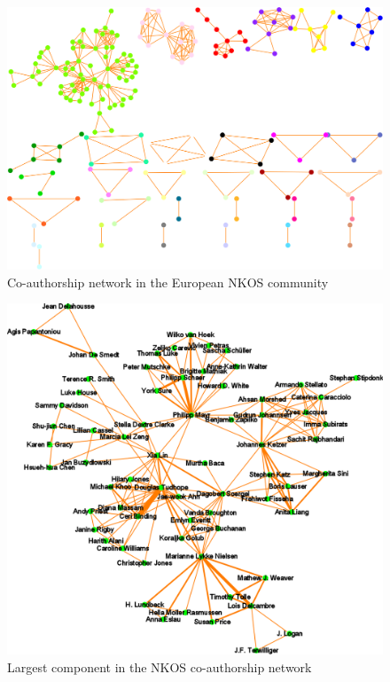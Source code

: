 \documentclass[runningheads,a4paper]{llncs}
\begin{document}
\begin{figure}
	\centering
	\includegraphics[width=1.0\linewidth]{wholeNet}
	\vspace{-0.5em}
	\caption{Co-authorship network in the European NKOS community}
	\label{fig:wholenet}
	\vspace{-0.5em}
\end{figure}

\begin{figure}
	\centering
	\includegraphics[width=0.9\linewidth]{largestComponent}
	\caption{Largest component in the NKOS co-authorship network}
	\label{fig:largestComponent}
\end{figure}
\end{document}
